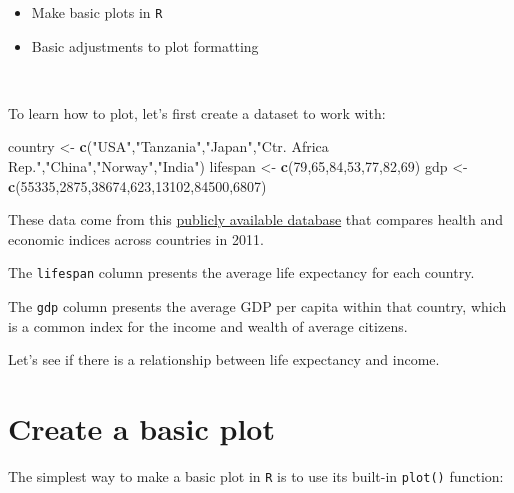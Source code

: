 \documentclass[
]{book}
\newenvironment{Shaded}{\begin{snugshade}}{\end{snugshade}}
\newcommand{\DecValTok}[1]{\textcolor[rgb]{0.00,0.00,0.81}{#1}}
\newcommand{\KeywordTok}[1]{\textcolor[rgb]{0.13,0.29,0.53}{\textbf{#1}}}
\newcommand{\NormalTok}[1]{#1}
\newcommand{\StringTok}[1]{\textcolor[rgb]{0.31,0.60,0.02}{#1}}
\providecommand{\tightlist}{%
  \setlength{\itemsep}{0pt}\setlength{\parskip}{0pt}}
\begin{document}
\begin{itemize}
\tightlist
\item
  Make basic plots in \texttt{R}
\item
  Basic adjustments to plot formatting
\end{itemize}

~

To learn how to plot, let's first create a dataset to work with:

\begin{Shaded}
\begin{Highlighting}[]
\NormalTok{country <-}\StringTok{ }\KeywordTok{c}\NormalTok{(}\StringTok{"USA"}\NormalTok{,}\StringTok{"Tanzania"}\NormalTok{,}\StringTok{"Japan"}\NormalTok{,}\StringTok{"Ctr. Africa Rep."}\NormalTok{,}\StringTok{"China"}\NormalTok{,}\StringTok{"Norway"}\NormalTok{,}\StringTok{"India"}\NormalTok{)}
\NormalTok{lifespan <-}\StringTok{ }\KeywordTok{c}\NormalTok{(}\DecValTok{79}\NormalTok{,}\DecValTok{65}\NormalTok{,}\DecValTok{84}\NormalTok{,}\DecValTok{53}\NormalTok{,}\DecValTok{77}\NormalTok{,}\DecValTok{82}\NormalTok{,}\DecValTok{69}\NormalTok{)}
\NormalTok{gdp <-}\StringTok{ }\KeywordTok{c}\NormalTok{(}\DecValTok{55335}\NormalTok{,}\DecValTok{2875}\NormalTok{,}\DecValTok{38674}\NormalTok{,}\DecValTok{623}\NormalTok{,}\DecValTok{13102}\NormalTok{,}\DecValTok{84500}\NormalTok{,}\DecValTok{6807}\NormalTok{)}
\end{Highlighting}
\end{Shaded}

These data come from this \href{https://datasets.iisg.amsterdam/dataset.xhtml?persistentId=hdl:10622/LKYT53}{publicly available database} that compares health and economic indices across countries in 2011.

The \texttt{lifespan} column presents the average life expectancy for each country.

The \texttt{gdp} column presents the average GDP per capita within that country, which is a common index for the income and wealth of average citizens.

Let's see if there is a relationship between life expectancy and income.

\hypertarget{create-a-basic-plot}{%
\section*{Create a basic plot}\label{create-a-basic-plot}}

The simplest way to make a basic plot in \texttt{R} is to use its built-in \texttt{plot()} function:
\end{document}
